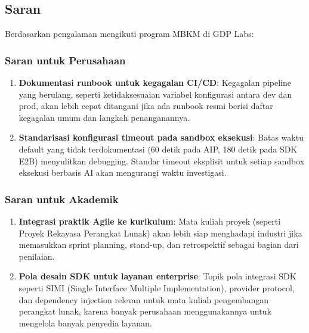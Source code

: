 \subsection{Saran}

Berdasarkan pengalaman mengikuti program MBKM di GDP Labs:

\subsubsection{Saran untuk Perusahaan}
\begin{enumerate}
    \item \textbf{Dokumentasi runbook untuk kegagalan CI/CD}: Kegagalan pipeline yang berulang, seperti ketidaksesuaian variabel konfigurasi antara dev dan prod, akan lebih cepat ditangani jika ada runbook resmi berisi daftar kegagalan umum dan langkah penanganannya.
    \item \textbf{Standarisasi konfigurasi timeout pada sandbox eksekusi}: Batas waktu default yang tidak terdokumentasi (60 detik pada AIP, 180 detik pada SDK E2B) menyulitkan debugging. Standar timeout eksplisit untuk setiap sandbox eksekusi berbasis AI akan mengurangi waktu investigasi.
\end{enumerate}

\subsubsection{Saran untuk Akademik}
\begin{enumerate}
    \item \textbf{Integrasi praktik Agile ke kurikulum}: Mata kuliah proyek (seperti Proyek Rekayasa Perangkat Lunak) akan lebih siap menghadapi industri jika memasukkan sprint planning, stand-up, dan retrospektif sebagai bagian dari penilaian.
    \item \textbf{Pola desain SDK untuk layanan enterprise}: Topik pola integrasi SDK seperti SIMI (Single Interface Multiple Implementation), provider protocol, dan dependency injection relevan untuk mata kuliah pengembangan perangkat lunak, karena banyak perusahaan menggunakannya untuk mengelola banyak penyedia layanan.
\end{enumerate}

\clearpage
